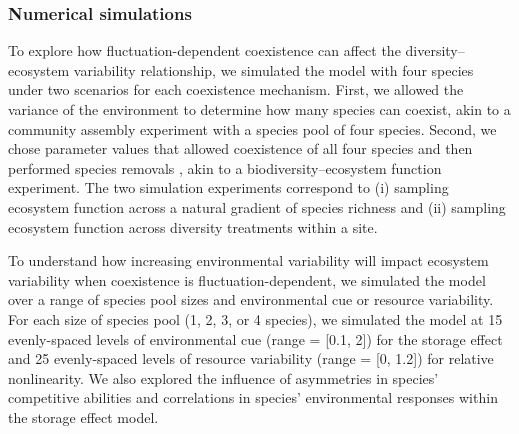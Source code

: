 \documentclass[12pt,]{article}
\begin{document}
\subsubsection{Numerical simulations}\label{numerical-simulations}

To explore how fluctuation-dependent coexistence can affect the
diversity--ecosystem variability relationship, we simulated the model
with four species under two scenarios for each coexistence mechanism.
First, we allowed the variance of the environment to determine how many
species can coexist, akin to a community assembly experiment with a
species pool of four species.
Second, we chose parameter values that allowed coexistence of all four
species and then performed species removals
, akin to a
biodiversity--ecosystem function experiment. The two simulation
experiments correspond to (i) sampling ecosystem function across a
natural gradient of species richness and (ii) sampling ecosystem
function across diversity treatments within a site.

To understand how increasing environmental variability will impact
ecosystem variability when coexistence is fluctuation-dependent, we
simulated the model over a range of species pool sizes and environmental
cue or resource variability. For each size of species pool (1, 2, 3, or
4 species), we simulated the model at 15 evenly-spaced levels of
environmental cue (range = {[}0.1, 2{]}) for the storage effect and 25
evenly-spaced levels of resource variability (range = {[}0, 1.2{]}) for
relative nonlinearity. We also explored the influence of asymmetries in
species' competitive abilities and correlations in species'
environmental responses within the storage effect model.
\end{document}

